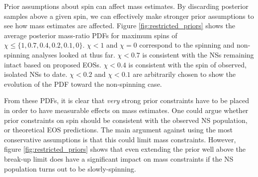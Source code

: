 Prior assumptions about spin can affect mass estimates.  By discarding posterior samples above a given spin, we can effectively make stronger prior assumptions to see how mass estimates are affected.  Figure \ref{fig:restricted_priors} shows the average posterior mass-ratio PDFs for maximum spins of $\chi \leq \{1, 0.7, 0.4, 0.2, 0.1, 0\}$.  $\chi<1$ and $\chi=0$ correspond to the spinning and non-spinning analyses looked at thus far.  $\chi<0.7$ is consistent with the NSs remaining intact based on proposed EOSs.  $\chi<0.4$ is consistent with the spin of observed, isolated NSs to date.  $\chi<0.2$ and $\chi<0.1$ are arbitrarily chosen to show the evolution of the PDF toward the non-spinning case.

From these PDFs, it is clear that \emph{very} strong prior constraints have to be placed in order to have measurable effects on mass estimates. One could argue whether prior constraints on spin should be consistent with the observed NS population, or theoretical EOS predictions.  The main argument against using the most conservative assumptions is that this could limit mass constraints.  However, figure \ref{fig:restricted_priors} shows that even extending the prior well above the break-up limit does have a significant impact on mass constraints if the NS population turns out to be slowly-spinning.